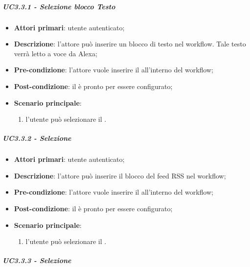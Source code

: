 \pagebreak
\subparagraph{UC3.3.1 - Selezione blocco Testo}

\begin{itemize}
\item \textbf{Attori primari}:  utente autenticato;

\item \textbf{Descrizione}: l'attore può inserire un blocco di testo nel workflow. Tale testo verrà letto a voce da Alexa;

\item \textbf{Pre-condizione}: l'attore vuole inserire il \BTesto{} all'interno del workflow;

\item \textbf{Post-condizione}: il \BTesto{} è pronto per essere configurato;

\item \textbf{Scenario principale}:
\begin{enumerate}
\item l'utente può selezionare il \BTesto{}.
\end{enumerate}
\end{itemize}

\subparagraph{UC3.3.2 - Selezione \BFeedRSS{}}

\begin{itemize}
\item \textbf{Attori primari}:  utente autenticato;

\item \textbf{Descrizione}: l'attore può inserire il blocco del feed RSS nel workflow;

\item \textbf{Pre-condizione}: l'attore vuole inserire il \BFeedRSS{} all'interno del workflow;

\item \textbf{Post-condizione}: il \BFeedRSS{} è pronto per essere configurato;

\item \textbf{Scenario principale}:
\begin{enumerate}
\item l'utente può selezionare il \BFeedRSS{}.
\end{enumerate}
\end{itemize}

\subparagraph{UC3.3.3 - Selezione \BFiltro{}}

